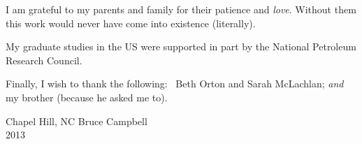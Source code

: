 

\def\baselinestretch{1.0}
 I am grateful to my parents and family for their
patience and {\em love}. Without them this work would never have come into
existence (literally).

My graduate studies in the US were supported in part by the National
Petroleum Research Council.

\medskip
Finally, I wish to thank the following: \,  Beth Orton and Sarah McLachlan;
{\em and } my brother (because he asked me to).

\bigskip\medskip

\noindent Chapel Hill, NC \hfill Bruce Campbell\\
2013

